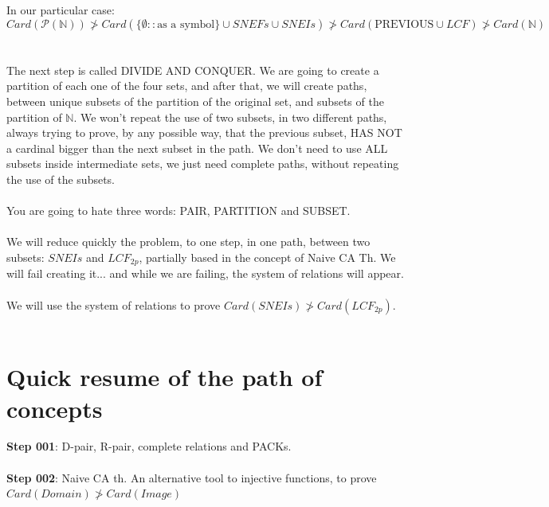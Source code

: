 	\noindent
	In our particular case:\\
	$$ Card( \mathcal{P}(\mathbb{N}) ) \ngtr Card( \{ \emptyset::\text{as a symbol} \} \cup SNEFs \cup SNEIs) \ngtr Card( \text{PREVIOUS} \cup LCF) \ngtr Card(\mathbb{N}) $$
	\\\\
	
	\noindent
	The next step is called DIVIDE AND CONQUER. We are going to create a partition of each one of the four sets, and after that, we will create paths, between unique subsets of the partition of the original set, and subsets of the partition of $\mathbb{N}$. We won't repeat the use of two subsets, in two different paths, always trying to prove, by any possible way, that the previous subset, HAS NOT a cardinal bigger than the next subset in the path. We don't need to use ALL subsets inside intermediate sets, we just need complete paths, without repeating the use of the subsets.
	\\\\
	
	\noindent
	You are going to hate three words: PAIR, PARTITION and SUBSET.
	\\\\
	
	\noindent
	We will reduce quickly the problem, to one step, in one path, between two subsets: $SNEIs$ and $LCF_{2p}$, partially based in the concept of Naive CA Th. We will fail creating it... and while we are failing, the system of relations will appear.
	\\\\
	
	\noindent
	We will use the system of relations to prove $Card(SNEIs) \ngtr Card(LCF_{2p}) $.
	\\\\
	
	\section{ Quick resume of the path of concepts }
		
		\noindent
		\textbf{Step 001}: D-pair, R-pair, complete relations and PACKs.
		\\\\
		
		\noindent
		\textbf{Step 002}: Naive CA th. An alternative tool to injective functions, to prove $ Card(Domain) \ngtr Card(Image) $ 
		\\\\
		

